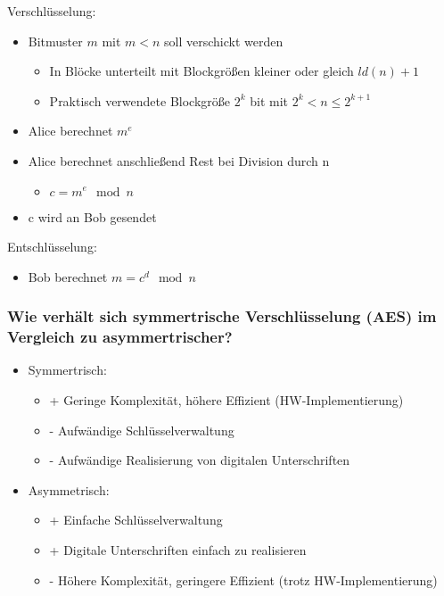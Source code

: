 	Verschlüsselung:
	\begin{itemize}
		\item Bitmuster $m$ mit $m < n$ soll verschickt werden
		\begin{itemize}
			\item In Blöcke unterteilt mit Blockgrößen kleiner oder gleich $ld(n)+1$ 
			\item Praktisch verwendete Blockgröße $2^k$ bit mit $2^k < n \leq 2^{k+1}$	
		\end{itemize}
		\item Alice berechnet $m^e$
		\item Alice berechnet anschließend Rest bei Division durch n
		\begin{itemize}
			\item $c = m^e \mod n$
		\end{itemize}
		\item c wird an Bob gesendet
	\end{itemize}
	
	Entschlüsselung:
	\begin{itemize}
		\item Bob berechnet $ m = c^d \mod n$
	\end{itemize}
	
	\subsubsection{Wie verhält sich symmertrische Verschlüsselung (AES) im Vergleich zu asymmertrischer?}
	\begin{itemize}
		\item Symmertrisch:
		\begin{itemize}
			\item + Geringe Komplexität, höhere Effizient (HW-Implementierung)
			\item - Aufwändige Schlüsselverwaltung
			\item - Aufwändige Realisierung von digitalen Unterschriften
		\end{itemize}
		
		\item Asymmetrisch:
		\begin{itemize}
			\item + Einfache Schlüsselverwaltung
			\item + Digitale Unterschriften einfach zu realisieren
			\item - Höhere Komplexität, geringere Effizient (trotz HW-Implementierung)
		\end{itemize}
	\end{itemize}
	

